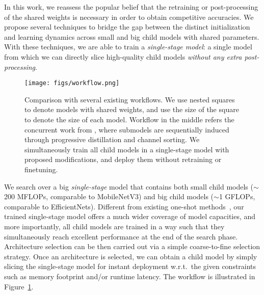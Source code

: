 \documentclass[runningheads]{llncs}
\begin{document}
In this work, we reassess the popular belief that the retraining or post-processing of the shared weights is necessary in order to obtain competitive accuracies. We propose several techniques to bridge the gap between the distinct initialization and learning dynamics across small and big child models with shared parameters. With these techniques, we are able to train a \textit{single-stage model}: a single model from which we can directly slice high-quality child models \emph{without any extra post-processing}.

\begin{figure}[tb!]
\centering
\texttt{[image: figs/workflow.png]}
\caption{Comparison with several existing workflows. We use nested squares to denote models with shared weights, and use the size of the square to denote the size of each model. Workflow in the middle refers the concurrent work from \cite{cai2019once}, where submodels are sequentially induced through progressive distillation and channel sorting. We simultaneously train all child models in a single-stage model with proposed modifications, and deploy them without retraining or finetuning.
}
\label{figs:schematic}
\end{figure}

We search over a big \emph{single-stage} model that contains both small child models ($\sim$200 MFLOPs, comparable to MobileNetV3) and big child models ($\sim$1 GFLOPs, comparable to EfficientNets). Different from existing one-shot methods~\cite{bender2018understanding,liu2018darts,brock2018smash,pham2018efficient,yu2019network}, our trained single-stage model offers a much wider coverage of model capacities, and more importantly, all child models are trained in a way such that they simultaneously reach excellent performance at the end of the search phase. Architecture selection can be then carried out via a simple coarse-to-fine selection strategy. Once an architecture is selected, we can obtain a child model by simply slicing the single-stage model for instant deployment w.r.t.\ the given constraints such as memory footprint and/or runtime latency. The workflow is illustrated in Figure~\ref{figs:schematic}.
\end{document}
